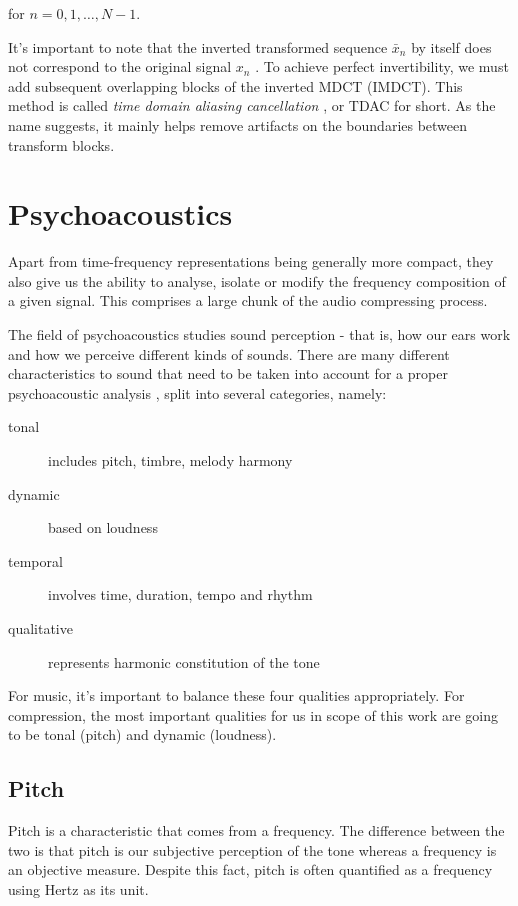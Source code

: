 for $n = 0, 1, \ldots, N-1$.

It's important to note that the inverted transformed sequence $\bar{x}_n$ by itself does not correspond to the original signal $x_n$ \cite{prince_1986_tdac_1}. To achieve perfect invertibility, we must add subsequent overlapping blocks of the inverted MDCT (IMDCT). This method is called \emph{time domain aliasing cancellation} \cite{prince_1986_tdac_2}, or TDAC for short. As the name suggests, it mainly helps remove artifacts on the boundaries between transform blocks.

\section{Psychoacoustics}
Apart from time-frequency representations being generally more compact, they also give us the ability to analyse, isolate or modify the frequency composition of a given signal. This comprises a large chunk of the audio compressing process.

The field of psychoacoustics studies sound perception - that is, how our ears work and how we perceive different kinds of sounds. There are many different characteristics to sound that need to be taken into account for a proper psychoacoustic analysis \cite{olson1967music}, split into several categories, namely:

\begin{description}
	\item[tonal] includes pitch, timbre, melody harmony
	\item[dynamic] based on loudness
	\item[temporal] involves time, duration, tempo and rhythm
	\item[qualitative] represents harmonic constitution of the tone
\end{description}

For music, it's important to balance these four qualities appropriately. For compression, the most important qualities for us in scope of this work are going to be tonal (pitch) and dynamic (loudness).

\subsection{Pitch}
Pitch is a characteristic that comes from a frequency. The difference between the two is that pitch is our subjective perception of the tone whereas a frequency is an objective measure. Despite this fact, pitch is often quantified as a frequency using Hertz as its unit.

